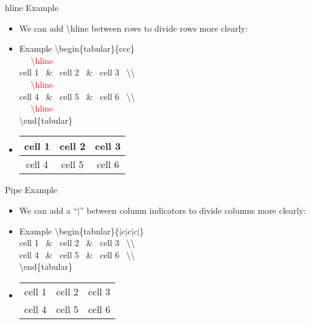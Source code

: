 \documentclass{beamer}
\begin{document}
\begin{frame}{hline Example}
\begin{itemize}
\item We can add \textbackslash hline between rows to divide rows more clearly:
\pause \item[]\begin{block}{Example}
\textbackslash begin\{tabular\}\{ccc\}\\
~~ \textcolor{red}{\textbackslash hline}\\
cell 1 ~\&~ cell 2~ \&~ cell 3 ~\textbackslash \textbackslash~~\\
~~ \textcolor{red}{\textbackslash hline}\\
cell 4 ~\&~ cell 5~ \&~ cell 6 ~\textbackslash \textbackslash~~\\
~~ \textcolor{red}{\textbackslash hline}\\
\textbackslash end\{tabular\}
\end{block}
\vspace{0.2cm}
\pause \item[]\begin{tabular}{ccc}
\hline
cell 1 & cell 2 & cell 3 \\
\hline
cell 4 & cell 5 & cell 6 \\
\hline
\end{tabular}
\end{itemize}
\end{frame}

\begin{frame}{Pipe Example}
\begin{itemize}
\item We can add a ``$|$'' between column indicators to divide columns more
clearly:
\pause \item[]\begin{block}{Example}
\textbackslash begin\{tabular\}\{$|c|c|c|$\}\\
cell 1 ~\&~ cell 2~ \&~ cell 3 ~\textbackslash \textbackslash~~\\
cell 4 ~\&~ cell 5~ \&~ cell 6 ~\textbackslash \textbackslash~~\\
\textbackslash end\{tabular\}
\end{block}
\vspace{0.2cm}
\pause \item[]\begin{tabular}{|c|c|c|}
cell 1 & cell 2 & cell 3 \\
cell 4 & cell 5 & cell 6 \\
\end{tabular}
\end{itemize}
\end{frame}
\end{document}
